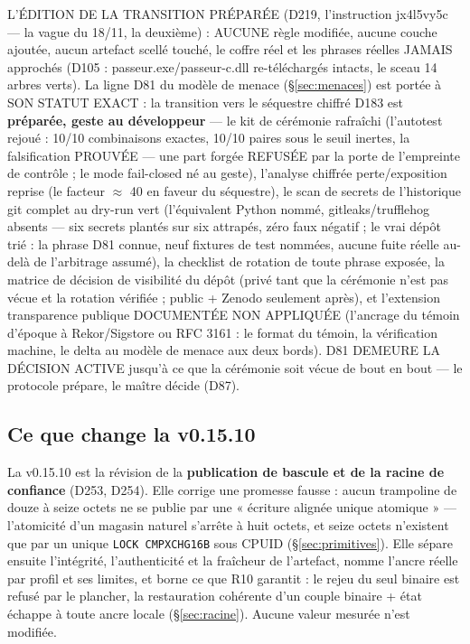 L'ÉDITION DE LA TRANSITION PRÉPARÉE (D219, l'instruction jx4l5vy5c — la
vague du 18/11, la deuxième) : AUCUNE règle modifiée, aucune couche
ajoutée, aucun artefact scellé touché, le coffre réel et les phrases
réelles JAMAIS approchés (D105 : passeur.exe/passeur-c.dll re-téléchargés
intacts, le sceau 14 arbres verts). La ligne D81 du modèle de menace
(§\ref{sec:menaces}) est portée à SON STATUT EXACT : la transition vers
le séquestre chiffré D183 est \textbf{préparée, geste au développeur} —
le kit de cérémonie rafraîchi (l'autotest rejoué : 10/10 combinaisons
exactes, 10/10 paires sous le seuil inertes, la falsification PROUVÉE —
une part forgée REFUSÉE par la porte de l'empreinte de contrôle ; le
mode  fail-closed né au geste), l'analyse chiffrée
perte/exposition reprise (le facteur $\approx$ 40 en faveur du
séquestre), le scan de secrets de l'historique git complet au dry-run
vert (l'équivalent Python nommé, gitleaks/trufflehog absents — six
secrets plantés sur six attrapés, zéro faux négatif ; le vrai dépôt
trié : la phrase D81 connue, neuf fixtures de test nommées, aucune
fuite réelle au-delà de l'arbitrage assumé), la checklist de rotation de
toute phrase exposée, la matrice de décision de visibilité du dépôt
(privé tant que la cérémonie n'est pas vécue et la rotation vérifiée ;
public + Zenodo seulement après), et l'extension transparence publique
DOCUMENTÉE NON APPLIQUÉE (l'ancrage du témoin d'époque à Rekor/Sigstore
ou RFC 3161 : le format du témoin, la vérification machine, le delta au
modèle de menace aux deux bords). D81 DEMEURE LA DÉCISION ACTIVE
jusqu'à ce que la cérémonie soit vécue de bout en bout — le protocole
prépare, le maître décide (D87).

\subsection{Ce que change la v0.15.10}\label{sec:nouveautes159}

La v0.15.10 est la révision de la \textbf{publication de bascule et de la racine de confiance} (D253,
D254). Elle corrige une promesse fausse : aucun trampoline de douze à seize octets ne se publie par une
« écriture alignée unique atomique » — l’atomicité d’un magasin naturel s’arrête à huit octets, et
seize octets n’existent que par un unique \texttt{LOCK CMPXCHG16B} sous CPUID (§\ref{sec:primitives}).
Elle sépare ensuite l’intégrité, l’authenticité et la fraîcheur de l’artefact, nomme l’ancre réelle par
profil et ses limites, et borne ce que R10 garantit : le rejeu du seul binaire est refusé par le plancher,
la restauration cohérente d’un couple binaire + état échappe à toute ancre locale
(§\ref{sec:racine}). Aucune valeur mesurée n’est modifiée.

